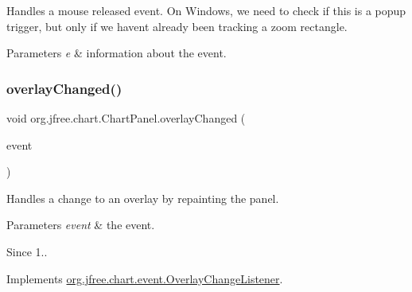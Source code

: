 Handles a \textquotesingle{}mouse released\textquotesingle{} event. On Windows, we need to check if this is a popup trigger, but only if we haven\textquotesingle{}t already been tracking a zoom rectangle.


\begin{DoxyParams}{Parameters}
{\em e} & information about the event. \\
\hline
\end{DoxyParams}
\mbox{\label{classorg_1_1jfree_1_1chart_1_1_chart_panel_a62bd903d184caa407418637fd8fdfc66}} 
\subsubsection{\texorpdfstring{overlay\+Changed()}{overlayChanged()}}
{\footnotesize\ttfamily void org.\+jfree.\+chart.\+Chart\+Panel.\+overlay\+Changed (\begin{DoxyParamCaption}\item[{\mbox{\hyperlink{classorg_1_1jfree_1_1chart_1_1event_1_1_overlay_change_event}{Overlay\+Change\+Event}}}]{event }\end{DoxyParamCaption})}

Handles a change to an overlay by repainting the panel.


\begin{DoxyParams}{Parameters}
{\em event} & the event.\\
\hline
\end{DoxyParams}
\begin{DoxySince}{Since}
1.. 
\end{DoxySince}


Implements \mbox{\hyperlink{interfaceorg_1_1jfree_1_1chart_1_1event_1_1_overlay_change_listener_abadcf94b887953665dc22734823cc413}{org.\+jfree.\+chart.\+event.\+Overlay\+Change\+Listener}}.

\mbox{\label{classorg_1_1jfree_1_1chart_1_1_chart_panel_ab8868dda0efc34971fa140b31569bcbc}} 
